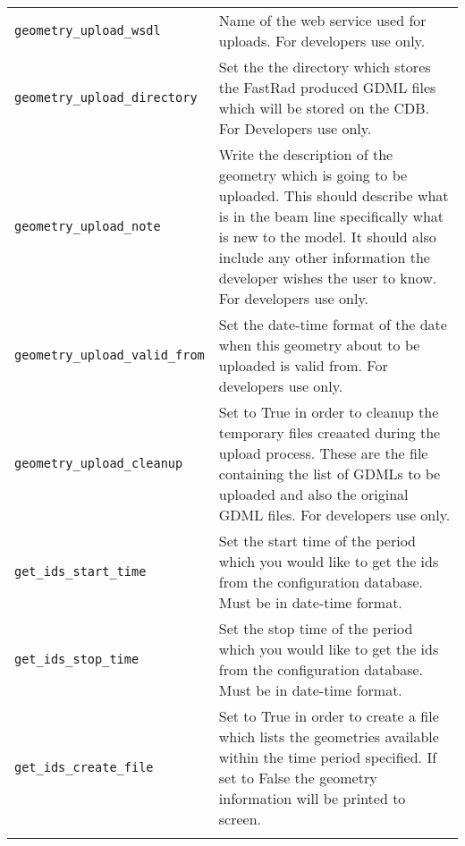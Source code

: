 \begin{table*}
\begin{center}
\begin{tabularx}{\textwidth}{lX}
\verb|geometry_upload_wsdl| & Name of the web service used for uploads. For developers use only.\\
\verb|geometry_upload_directory| & Set the the directory which stores the FastRad produced GDML files which will be stored on the CDB. For Developers
use only.\\
\verb|geometry_upload_note| & Write the description of the geometry which is going to be uploaded. This should describe what is in the beam line
specifically what is new to the model. It should also include any other information the developer wishes the user to know. For developers use only.\\
\verb|geometry_upload_valid_from| & Set the date-time format of the date when this geometry about to be uploaded is valid from. For developers use
only.\\
\verb|geometry_upload_cleanup| & Set to True in order to cleanup the temporary files creaated during the upload process. These are the file
containing the list of GDMLs to be uploaded and also the original GDML files. For developers use only.\\
\verb|get_ids_start_time| & Set the start time of the period which you would like to get the ids from the configuration database. Must be in
date-time format.\\
\verb|get_ids_stop_time| & Set the stop time of the period which you would like to get the ids from the configuration database. Must be in
date-time format.\\
\verb|get_ids_create_file| & Set to True in order to create a file which lists the geometries available within the time period specified. If set to
False the geometry information will be printed to screen.\\
\begin{makeimage} %
\end{makeimage} 
\end{tabularx}
\end{center}
\end{table*}
